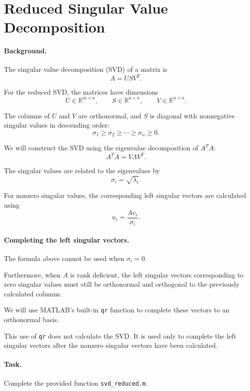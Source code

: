 \documentclass{ximera}
\begin{document}
\section{Reduced Singular Value Decomposition}

\paragraph{Background.}

The singular value decomposition (SVD) of a matrix is
\[
A=USV^T.
\]

For the reduced SVD, the matrices have dimensions
\[
U\in\mathbb{R}^{m\times n},\qquad
S\in\mathbb{R}^{n\times n},\qquad
V\in\mathbb{R}^{n\times n}.
\]

The columns of $U$ and $V$ are orthonormal, and $S$ is diagonal
with nonnegative singular values in descending order:
\[
\sigma_1\geq\sigma_2\geq\cdots\geq\sigma_n\geq0.
\]

We will construct the SVD using the eigenvalue decomposition
of $A^TA$:
\[
A^TA=V\Lambda V^T.
\]

The singular values are related to the eigenvalues by
\[
\sigma_i=\sqrt{\lambda_i}.
\]

For nonzero singular values, the corresponding left singular
vectors are calculated using
\[
u_i=\frac{Av_i}{\sigma_i}.
\]

\paragraph{Completing the left singular vectors.}

The formula above cannot be used when $\sigma_i=0$.

Furthermore, when $A$ is rank deficient, the left singular
vectors corresponding to zero singular values must still be
orthonormal and orthogonal to the previously calculated columns.

We will use MATLAB's built-in \texttt{qr} function to complete
these vectors to an orthonormal basis.

This use of \texttt{qr} does not calculate the SVD. It is used
only to complete the left singular vectors after the nonzero
singular vectors have been calculated.

\paragraph{Task.}

Complete the provided function \texttt{svd\_reduced.m}.
\end{document}
